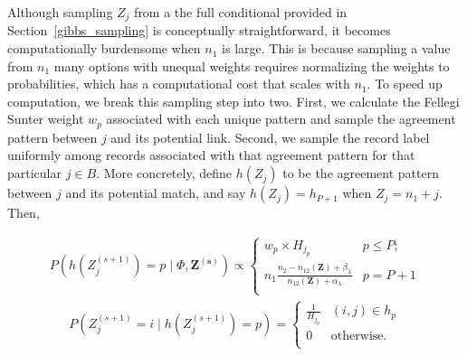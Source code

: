 \documentclass[ba]{imsart}
\begin{document}
Although sampling \(Z_j\) from a the full conditional provided in Section~\ref{gibbs_sampling} is conceptually straightforward, it becomes computationally burdensome when $n_1$ is large. This is because sampling a value from $n_1$ many options with unequal weights requires normalizing the weights to probabilities, which has a computational cost that scales with $n_1$. To speed up computation, we break this sampling step into two. First, we calculate the Fellegi Sunter weight \(w_{p}\) associated with each unique pattern and sample the agreement pattern between \(j\) and its potential link. Second, we sample the record label uniformly among records associated with that agreement pattern for that particular \(j\in B\). More concretely, define \(h(Z_j)\) to be the agreement pattern between \(j\) and its potential match, and say \(h(Z_j) = h_{P+1}\) when \(Z_j = n_1 + j\). Then,

	\begin{align}
		\label{eqn:gibbs1}
		P\left(h\left(Z_j^{(s+1)}\right) = p \mid \Phi, \bm{Z^{(s)}}\right) \propto
		\begin{cases} 
			w_{p}\times H_{j_p}  & p \leq P; \\
			n_1 \frac{n_2 - n_{12}(\bm{Z}) + \beta_{\lambda}}{n_{12}(\bm{Z}) + \alpha_{\lambda}} &   p = P + 1 \\
		\end{cases}
	\end{align}
	\begin{align}
		\label{eqn:gibbs2}
		P\left(Z_j^{(s+1)} = i \mid h\left(Z_j^{(s+1)}\right) = p\right) = \begin{cases} 
			\frac{1}{H_{j_p}} & (i, j) \in h_p \\
			0 & \text{otherwise.} \\
		\end{cases}
	\end{align}
	
\end{document}
